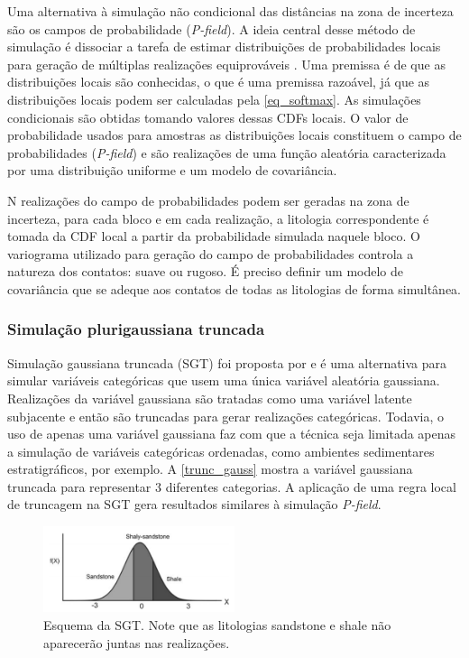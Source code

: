 Uma alternativa à simulação não condicional das distâncias na zona de incerteza são os campos de probabilidade (\textit{P-field}). A ideia central desse método de simulação é dissociar a tarefa de estimar distribuições de probabilidades locais para geração de múltiplas realizações equiprováveis \cite{froidevaux1993probability}. Uma premissa é de que as distribuições locais são conhecidas, o que é uma premissa razoável, já que as distribuições locais podem ser calculadas pela \autoref{eq_softmax}. As simulações condicionais são obtidas tomando valores dessas CDFs locais. O valor de probabilidade usados para amostras as distribuições locais constituem o campo de probabilidades (\textit{P-field}) e são realizações de uma função aleatória caracterizada por uma distribuição uniforme e um modelo de covariância.

N realizações do campo de probabilidades podem ser geradas na zona de incerteza, para cada bloco e em cada realização, a litologia correspondente é tomada da CDF local a partir da probabilidade simulada naquele bloco. O variograma utilizado para geração do campo de probabilidades controla a natureza dos contatos: suave ou rugoso. É preciso definir um modelo de covariância que se adeque aos contatos de todas as litologias de forma simultânea.

\subsubsection{Simulação plurigaussiana truncada}

Simulação gaussiana truncada (SGT) foi proposta por  e é uma alternativa para simular variáveis categóricas que usem uma única variável aleatória gaussiana. Realizações da variável gaussiana são tratadas como uma variável latente subjacente \cite{hier_plurigauss} e então são truncadas para gerar realizações categóricas. Todavia, o uso de apenas uma variável gaussiana faz com que a técnica seja limitada apenas a simulação de variáveis categóricas ordenadas, como ambientes sedimentares estratigráficos, por exemplo. A \autoref{trunc_gauss} mostra a variável gaussiana truncada para representar 3 diferentes categorias. A aplicação de uma regra local de truncagem na SGT gera resultados similares à simulação \textit{P-field}.

\begin{figure}[H]
	\caption{\label{trunc_gauss}Esquema da SGT. Note que as litologias sandstone e shale não aparecerão juntas nas realizações.}
	\begin{center}
		\includegraphics[width=0.5\textwidth]{capitulo_3/gauss_trunc_sketch.png}
	\end{center}
\end{figure}

